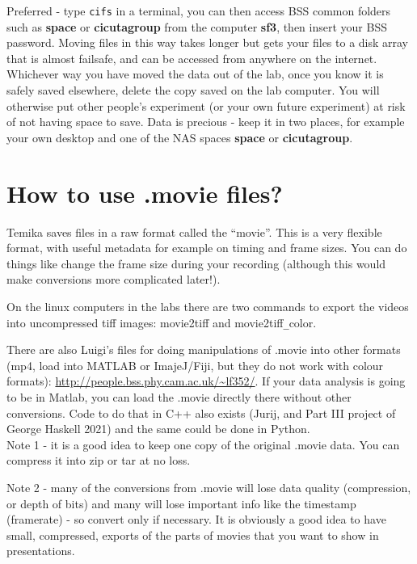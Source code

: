 \documentclass{report}
\begin{document}
Preferred - type \verb|cifs| in a  terminal,  you can then access BSS common folders such as \textbf{space} or \textbf{cicutagroup} from the computer \textbf{sf3}, then insert your BSS password. Moving files in this way takes longer but gets your files to a disk array that is almost failsafe, and can be accessed from anywhere on the internet.\\

Whichever way you have moved the data out of the lab, once you know it is safely saved elsewhere, delete the copy saved on the lab computer.   You will otherwise put other people's experiment (or your own future experiment) at risk of not having space to save.    Data is precious - keep it in two places, for example your own desktop and one of the NAS spaces \textbf{space} or \textbf{cicutagroup}.


\section{How to use .movie files?}
Temika saves files in a raw format called the ``movie''.   This is a very flexible format, with useful metadata for example on timing and frame sizes.   You can do things like change the frame size during your recording (although this would make conversions more complicated later!).


On the linux computers in the labs there are two commands to export the videos into uncompressed tiff images: movie2tiff and movie2tiff\verb|_|color.

There are also  Luigi’s files for doing manipulations of .movie into other formats (mp4, load into MATLAB or ImajeJ/Fiji, but they do not work with colour formats): \url{http://people.bss.phy.cam.ac.uk/~lf352/}. If your data analysis is going to be in Matlab, you can load the .movie directly there without other conversions. Code to do that in C++ also exists (Jurij, and Part III project of George Haskell 2021) and the same could be done in Python.\\

Note 1 - it is a good idea to keep one copy of the original .movie data.   You can compress it into zip or tar at no loss.

Note 2 -  many of the conversions from .movie will lose data quality (compression, or depth of bits) and many will lose important info like the timestamp (framerate) - so convert only if necessary.      It is obviously a good idea to have small, compressed, exports of the parts of movies that you want to show in presentations.
\end{document}
